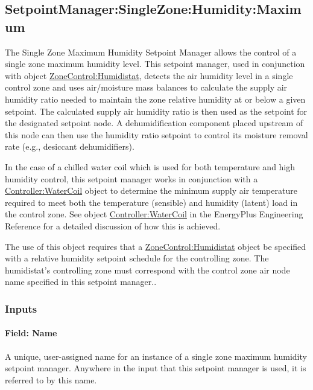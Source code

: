 \subsection{SetpointManager:SingleZone:Humidity:Maximum}\label{setpointmanagersinglezonehumiditymaximum}

The Single Zone Maximum Humidity Setpoint Manager allows the control of a single zone maximum humidity level. This setpoint manager, used in conjunction with object \hyperref[zonecontrolhumidistat]{ZoneControl:Humidistat}, detects the air humidity level in a single control zone and uses air/moisture mass balances to calculate the supply air humidity ratio needed to maintain the zone relative humidity at or below a given setpoint. The calculated supply air humidity ratio is then used as the setpoint for the designated setpoint node. A dehumidification component placed upstream of this node can then use the humidity ratio setpoint to control its moisture removal rate (e.g., desiccant dehumidifiers).

In the case of a chilled water coil which is used for both temperature and high humidity control, this setpoint manager works in conjunction with a \hyperref[controllerwatercoil]{Controller:WaterCoil} object to determine the minimum supply air temperature required to meet both the temperature (sensible) and humidity (latent) load in the control zone. See object \hyperref[controllerwatercoil]{Controller:WaterCoil} in the EnergyPlus Engineering Reference for a detailed discussion of how this is achieved.

The use of this object requires that a \hyperref[zonecontrolhumidistat]{ZoneControl:Humidistat} object be specified with a relative humidity setpoint schedule for the controlling zone. The humidistat's controlling zone must correspond with the control zone air node name specified in this setpoint manager..

\subsubsection{Inputs}\label{inputs-7-024}

\paragraph{Field: Name}\label{field-name-7-019}

A unique, user-assigned name for an instance of a single zone maximum humidity setpoint manager. Anywhere in the input that this setpoint manager is used, it is referred to by this name.

